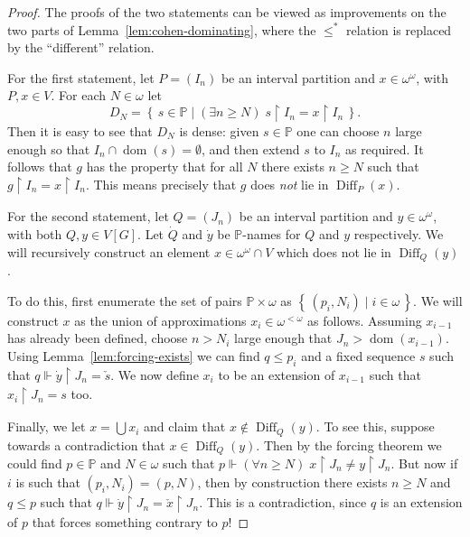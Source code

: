 \documentclass[11pt,oneside,a4paper]{amsbook}
\newcommand{\set}[1]{\left\{\,#1\,\right\}}
\newcommand{\PP}{\mathbb P}
\newcommand{\forces}{\Vdash}
\DeclareMathOperator{\dom}{dom}
\DeclareMathOperator{\Diff}{Diff}
\theoremstyle{definition}
\theoremstyle{plain}
\theoremstyle{definition}
\theoremstyle{remark}
\numberwithin{equation}{section}
\numberwithin{figure}{section}
\begin{document}
\begin{proof}
  The proofs of the two statements can be viewed as improvements on the two parts of Lemma~\ref{lem:cohen-dominating}, where the $\leq^*$ relation is replaced by the ``different'' relation.

  For the first statement, let $P=(I_n)$ be an interval partition and $x\in\omega^\omega$, with $P,x\in V$. For each $N\in\omega$ let
  \[D_N=\set{s\in\PP\mid(\exists n\geq N)\;s\restriction I_n=x\restriction I_n}\text{.}
  \]
  Then it is easy to see that $D_N$ is dense: given $s\in\PP$ one can choose $n$ large enough so that $I_n\cap\dom(s)=\emptyset$, and then extend $s$ to $I_n$ as required. It follows that $g$ has the property that for all $N$ there exists $n\geq N$ such that $g\restriction I_n=x\restriction I_n$. This means precisely that $g$ does \emph{not} lie in $\Diff_P(x)$.

  For the second statement, let $Q=(J_n)$ be an interval partition and $y\in\omega^\omega$, with both $Q,y\in V[G]$. Let $\dot Q$ and $\dot y$ be $\PP$-names for $Q$ and $y$ respectively. We will recursively construct an element $x\in\omega^\omega\cap V$ which does not lie in $\Diff_Q(y)$.

  To do this, first enumerate the set of pairs $\PP\times\omega$ as $\set{(p_i,N_i)\mid i\in\omega}$. We will construct $x$ as the union of approximations $x_i\in\omega^{<\omega}$ as follows. Assuming $x_{i-1}$ has already been defined, choose $n>N_i$ large enough that $J_n>\dom(x_{i-1})$. Using Lemma~\ref{lem:forcing-exists} we can find $q\leq p_i$ and a fixed sequence $s$ such that $q\forces \dot y\restriction J_n=\check s$. We now define $x_i$ to be an extension of $x_{i-1}$ such that $x_i\restriction J_n=s$ too.

  Finally, we let $x=\bigcup x_i$ and claim that $x\notin\Diff_Q(y)$. To see this, suppose towards a contradiction that $x\in\Diff_Q(y)$. Then by the forcing theorem we could find $p\in\PP$ and $N\in\omega$ such that $p\forces(\forall n\geq N)\;x\restriction J_n\neq y\restriction J_n$. But now if $i$ is such that $(p_i,N_i)=(p,N)$, then by construction there exists $n\geq N$ and $q\leq p$ such that $q\forces\dot y\restriction J_n=\check x\restriction J_n$. This is a contradiction, since $q$ is an extension of $p$ that forces something contrary to $p$!
\end{proof}

\end{document}

